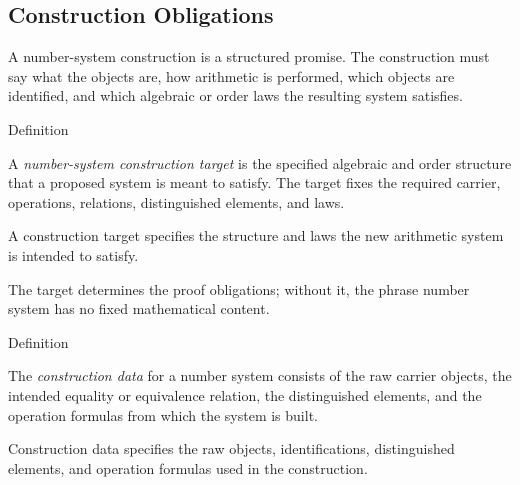\subsection*{Construction Obligations}

\begin{remark*}[Exposition]
A number-system construction is a structured promise. The construction must
say what the objects are, how arithmetic is performed, which objects are
identified, and which algebraic or order laws the resulting system satisfies.
\end{remark*}

\begin{definitionbox}{Definition}
\begin{definition}
\label{def:number-system-construction-target}
A \emph{number-system construction target} is the specified algebraic and
order structure that a proposed system is meant to satisfy. The target fixes
the required carrier, operations, relations, distinguished elements, and laws.
\end{definition}
\end{definitionbox}

\begin{remark*}
A construction target specifies the structure and laws the new arithmetic
system is intended to satisfy.
\end{remark*}

\begin{remark*}[Interpretation]
The target determines the proof obligations; without it, the phrase number
system has no fixed mathematical content.
\end{remark*}

\DefinitionalRoot

\begin{definitionbox}{Definition}
\begin{definition}
\label{def:number-system-construction-data}
The \emph{construction data} for a number system consists of the raw carrier
objects, the intended equality or equivalence relation, the distinguished
elements, and the operation formulas from which the system is built.
\end{definition}
\end{definitionbox}

\begin{remark*}
Construction data specifies the raw objects, identifications, distinguished
elements, and operation formulas used in the construction.
\end{remark*}

